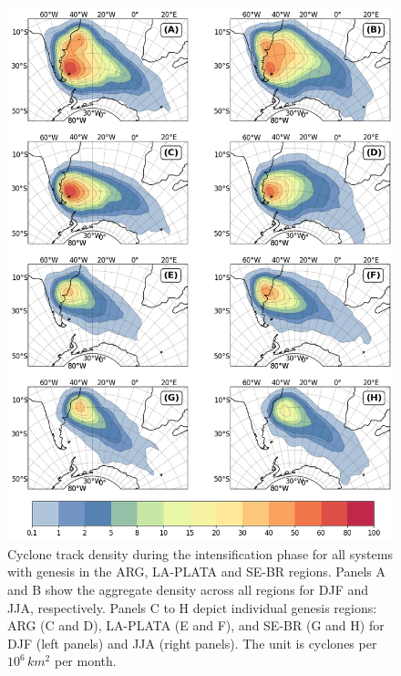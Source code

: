 \begin{figure}[!htbp]
\centering
\includegraphics[width=\textwidth]{figs_4/density_map_intensification.png}
\caption[Track Density - Intensification Phase]{Cyclone track density during the intensification phase for all systems with genesis in the ARG, LA-PLATA and SE-BR regions. Panels A and B show the aggregate density across all regions for DJF and JJA, respectively. Panels C to H depict individual genesis regions: ARG (C and D), LA-PLATA (E and F), and SE-BR (G and H) for DJF (left panels) and JJA (right panels). The unit is cyclones per \(10^6 \, km^2\) per month.}
\label{fig:density_map_intensification}
\end{figure}

